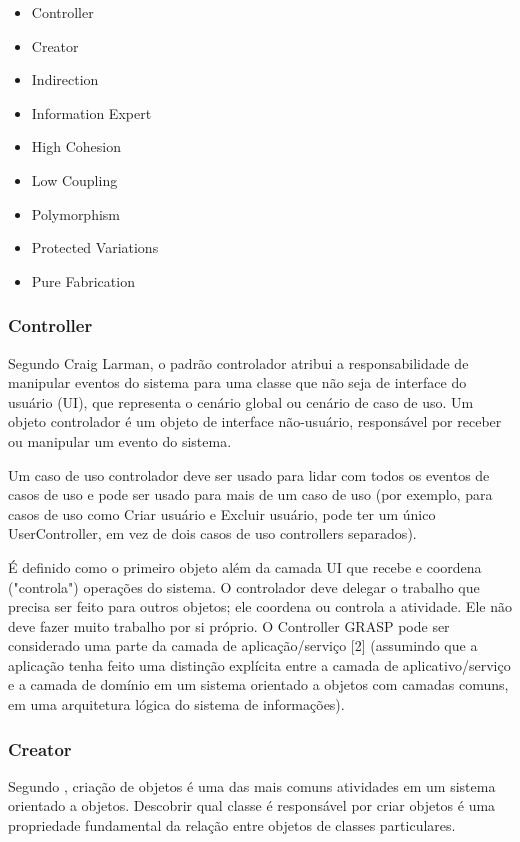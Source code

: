 \documentclass[12pt]{article}
\begin{document}
\begin{itemize}
	\item Controller
	\item Creator
	\item Indirection
	\item Information Expert
	\item High Cohesion
	\item Low Coupling
	\item Polymorphism
	\item Protected Variations
	\item Pure Fabrication
\end{itemize}


\subsubsection{Controller} \label{sec:grasp}

Segundo \cite{CRAIG_LARMAN} Craig Larman, o padrão controlador atribui a responsabilidade de manipular eventos do sistema para uma classe que não seja de interface do usuário (UI), que representa o cenário global ou cenário de caso de uso. Um objeto controlador é um objeto de interface não-usuário, responsável por receber ou manipular um evento do sistema.

Um caso de uso controlador deve ser usado para lidar com todos os eventos de casos de uso e pode ser usado para mais de um caso de uso (por exemplo, para casos de uso como Criar usuário e Excluir usuário, pode ter um único UserController, em vez de dois casos de uso controllers separados).

É definido como o primeiro objeto além da camada UI que recebe e coordena ("controla") operações do sistema. O controlador deve delegar o trabalho que precisa ser feito para outros objetos; ele coordena ou controla a atividade. Ele não deve fazer muito trabalho por si próprio. O Controller GRASP pode ser considerado uma parte da camada de aplicação/serviço [2] (assumindo que a aplicação tenha feito uma distinção explícita entre a camada de aplicativo/serviço e a camada de domínio em um sistema orientado a objetos com camadas comuns, em uma arquitetura lógica do sistema de informações).

\subsubsection{Creator}

Segundo \cite{CRAIG_LARMAN}, criação de objetos é uma das mais comuns atividades em um sistema orientado a objetos. Descobrir qual classe é responsável por criar objetos é uma propriedade fundamental da relação entre objetos de classes particulares.
\end{document}
